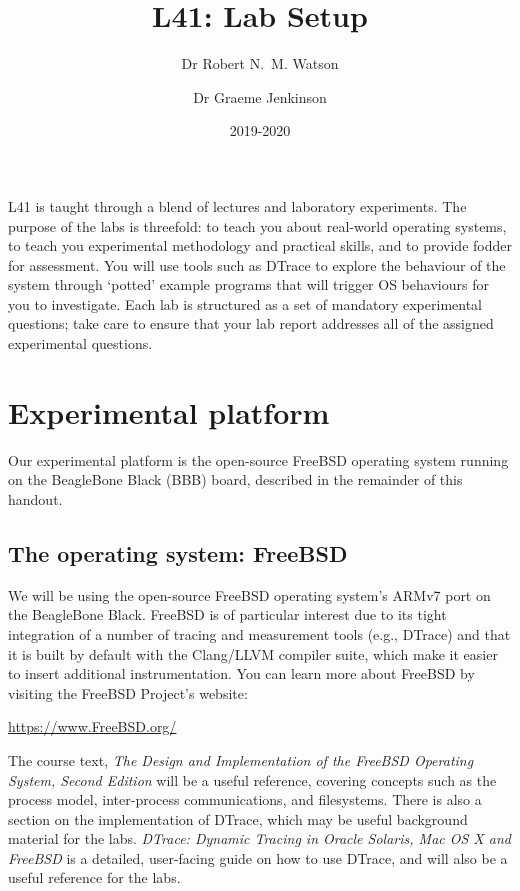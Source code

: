 \documentclass[a4paper,10pt]{article}
\begin{document}
\title{L41: Lab Setup}
\author{Dr Robert N.~M. Watson \and Dr Graeme Jenkinson}
\date{2019-2020}
\maketitle

L41 is taught through a blend of lectures and laboratory experiments.
The purpose of the labs is threefold: to teach you about real-world operating
systems, to teach you experimental methodology and practical skills, and to
provide fodder for assessment.
You will use tools such as DTrace to explore the behaviour of the system
through `potted' example programs that will trigger OS behaviours for you to
investigate.
Each lab is structured as a set of mandatory experimental questions; take care
to ensure that your lab report addresses all of the assigned experimental
questions.

\section*{Experimental platform}

Our experimental platform is the open-source FreeBSD operating system running
on the BeagleBone Black (BBB) board, described in the remainder of this
handout.

\subsection*{The operating system: FreeBSD}

We will be using the open-source FreeBSD operating system's ARMv7 port on the
BeagleBone Black.
FreeBSD is of particular interest due to its tight integration of a number of
tracing and measurement tools (e.g., DTrace) and that it is built by default
with the Clang/LLVM compiler suite, which make it easier to insert additional
instrumentation.
You can learn more about FreeBSD by visiting the FreeBSD Project's website:

\smallskip
\url{https://www.FreeBSD.org/}
\smallskip

The course text, \textit{The Design and Implementation of the FreeBSD
Operating System, Second Edition} will be a useful reference, covering
concepts such as the process model, inter-process communications, and
filesystems.
There is also a section on the implementation of DTrace, which may be useful
background material for the labs.
\textit{DTrace: Dynamic Tracing in Oracle Solaris, Mac OS X and FreeBSD} is a
detailed, user-facing guide on how to use DTrace, and will also be a useful
reference for the labs.
\end{document}
